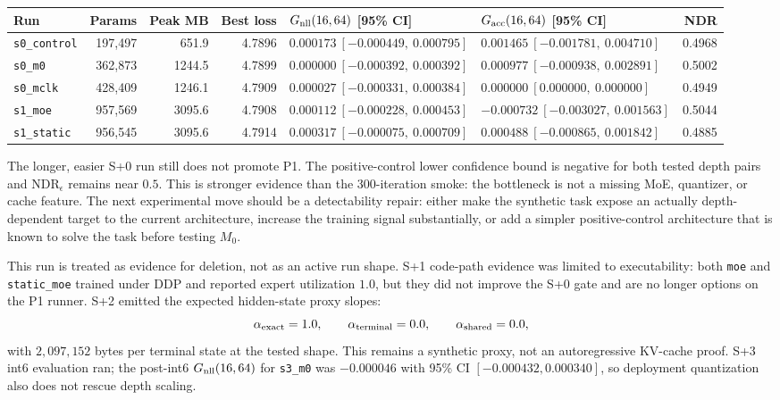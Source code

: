\documentclass[11pt]{article}
\newcommand{\code}[1]{\texttt{#1}}
\begin{document}
\begin{center}
\scriptsize
\setlength{\tabcolsep}{3pt}
\renewcommand{\arraystretch}{1.12}
\begin{tabularx}{\textwidth}{@{}L{0.17\textwidth} r r r L{0.22\textwidth} L{0.22\textwidth} r@{}}
\toprule
\textbf{Run} & \textbf{Params} & \textbf{Peak MB} & \textbf{Best loss} & \textbf{\(G_{\rm nll}(16,64)\) [95\% CI]} & \textbf{\(G_{\rm acc}(16,64)\) [95\% CI]} & \textbf{NDR} \\
\midrule
\code{s0\_control} & 197{,}497 & 651.9 & 4.7896 & \(0.000173\ [-0.000449,\ 0.000795]\) & \(0.001465\ [-0.001781,\ 0.004710]\) & 0.4968 \\
\code{s0\_m0} & 362{,}873 & 1244.5 & 4.7899 & \(0.000000\ [-0.000392,\ 0.000392]\) & \(0.000977\ [-0.000938,\ 0.002891]\) & 0.5002 \\
\code{s0\_mclk} & 428{,}409 & 1246.1 & 4.7909 & \(0.000027\ [-0.000331,\ 0.000384]\) & \(0.000000\ [0.000000,\ 0.000000]\) & 0.4949 \\
\code{s1\_moe} & 957{,}569 & 3095.6 & 4.7908 & \(0.000112\ [-0.000228,\ 0.000453]\) & \(-0.000732\ [-0.003027,\ 0.001563]\) & 0.5044 \\
\code{s1\_static} & 956{,}545 & 3095.6 & 4.7914 & \(0.000317\ [-0.000075,\ 0.000709]\) & \(0.000488\ [-0.000865,\ 0.001842]\) & 0.4885 \\
\bottomrule
\end{tabularx}
\end{center}

The longer, easier S+0 run still does not promote P1.  The positive-control lower confidence bound
is negative for both tested depth pairs and \(\mathrm{NDR}_\epsilon\) remains near \(0.5\).  This is
stronger evidence than the 300-iteration smoke: the bottleneck is not a missing MoE, quantizer, or
cache feature.  The next experimental move should be a detectability repair: either make the
synthetic task expose an actually depth-dependent target to the current architecture, increase the
training signal substantially, or add a simpler positive-control architecture that is known to solve
the task before testing \(M_0\).

This run is treated as evidence for deletion, not as an active run shape.  S+1 code-path evidence
was limited to executability: both \code{moe} and \code{static\_moe} trained under DDP and reported
expert utilization \(1.0\), but they did not improve the S+0 gate and are no longer options on the
P1 runner.  S+2 emitted the expected hidden-state proxy slopes:
\[
  \alpha_{\rm exact}=1.0,\qquad
  \alpha_{\rm terminal}=0.0,\qquad
  \alpha_{\rm shared}=0.0,
\]
with \(2{,}097{,}152\) bytes per terminal state at the tested shape.  This remains a synthetic
proxy, not an autoregressive KV-cache proof.  S+3 int6 evaluation ran; the post-int6
\(G_{\rm nll}(16,64)\) for \code{s3\_m0} was \(-0.000046\) with 95\% CI
\([-0.000432,0.000340]\), so deployment quantization also does not rescue depth scaling.
\end{document}
